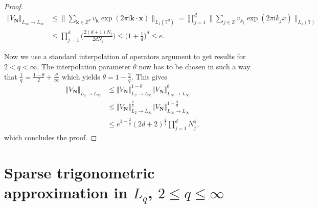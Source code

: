\documentclass[11pt,reqno]{article}
\numberwithin{equation}{section}
\theoremstyle{definition}
\theoremstyle{plain}
\newcommand{\zz}{\ensuremath{\mathbb{Z}}}
\newcommand{\Z}{{\ensuremath{\zz}^d}}
\newcommand{\bk}{\ensuremath{\mathbf k}}
\newcommand{\bN}{\ensuremath{\mathbf N}}
\newcommand{\bx}{\ensuremath{\mathbf x}}
\begin{document}
\begin{proof}
 

  \noindent
 \begin{equation}
  \begin{split}
   \Vert V_\bN \Vert_{L_\infty \to L_\infty} 
&\leq \Big\|\sum_{\bk \in \Z} v_\bk \exp(2 \pi \mathrm{i} \bk \cdot \bx)
\Big\|_{L_1(\mathbb{T}^d)} = \prod\limits_{j=1}^d
\Big\|\sum_{j \in \zz} v_{k_j} \exp(2 \pi \mathrm{i} k_j x) 
\Big\|_{L_1(\mathbb{T})}\\
&\leq \prod\limits_{j=1}^d \Big(\frac{2(d+1)N_j}{2dN_j}\Big) \leq \Big(1+\frac{1}{d}\Big)^d \leq e. 
 \end{split}
 \end{equation}


 

Now we use a standard interpolation of operators argument to get results for \(2 < q < \infty\).
The interpolation parameter \(\theta\) now has to be chosen in such a way that \(\frac{1}{q}= \frac{1-\theta}{2}+ \frac{\theta}{\infty}\) which yields \(\theta = 1 - \frac{2}{q}\). This gives
\begin{align}
   \Vert V_\bN \Vert_{L_q \to L_\infty} & \leq  \Vert V_\bN \Vert_{L_2 \to L_\infty}^{1-\theta} \Vert V_\bN \Vert_{L_\infty \to L_\infty}^\theta \\
    & \leq \Vert V_\bN \Vert_{L_2 \to L_\infty}^{\frac{2}{q}} \Vert V_\bN \Vert_{L_\infty \to L_\infty}^{1-\frac{2}{q}} \\
    & \leq  e^{1-\frac{2}{q}} (2d+2)^{\frac{d}{q}} \prod_{j = 1}^d N_j^{\frac{1}{q}},
\end{align}
 \noindent
which concludes the proof. 
\end{proof}



\section{Sparse trigonometric approximation in $L_q$, $2\leq q \leq \infty$}\label{sec:4}
\end{document}
